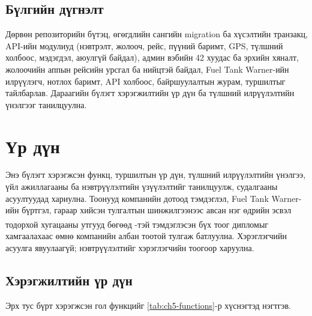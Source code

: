 \documentclass[
12pt,
oneside,
english,
onehalfspacing,
nolistspacing,
headsepline,
]{MUST-Thesis}
\newcommand{\batlah}[1]{#1\textsuperscript{\dag}}
\begin{document}
\section{Бүлгийн дүгнэлт}

Дөрвөн репозиторийн бүтэц, өгөгдлийн сангийн migration ба хүсэлтийн транзакц, API-ийн модулиуд (нэвтрэлт, жолооч, рейс, пүүний баримт, GPS, түлшний холбоос, мэдэгдэл, аюулгүй байдал), админ вэбийн 42 хуудас ба эрхийн хяналт, жолоочийн аппын рейсийн урсгал ба нийцтэй байдал, Fuel Tank Warner-ийн илрүүлэгч, нотлох баримт, API холбоос, байршуулалтын журам, туршилтыг тайлбарлав. Дараагийн бүлэгт хэрэгжилтийн үр дүн ба түлшний илрүүлэлтийн үнэлгээг танилцуулна.

\chapter{Үр дүн}

Энэ бүлэгт хэрэгжсэн функц, туршилтын үр дүн, түлшний илрүүлэлтийн үнэлгээ, үйл ажиллагааны ба нэвтрүүлэлтийн үзүүлэлтийг танилцуулж, судалгааны асуултуудад хариулна. Тоонууд компанийн дотоод тэмдэглэл, Fuel Tank Warner-ийн бүртгэл, гараар хийсэн тулгалтын шинжилгээнээс авсан нэг өдрийн эсвэл тодорхой хугацааны утгууд бөгөөд \batlah{}-тэй тэмдэглэсэн бүх тоог дипломыг хамгаалахаас өмнө компанийн албан тоотой тулгаж батлуулна. Хэрэглэгчийн асуулга явуулаагүй; нэвтрүүлэлтийг хэрэглэгчийн тоогоор харуулна.

\section{Хэрэгжилтийн үр дүн}

Эрх тус бүрт хэрэгжсэн гол функцийг \ref{tab:ch5-functions}-р хүснэгтэд нэгтгэв.
\end{document}
